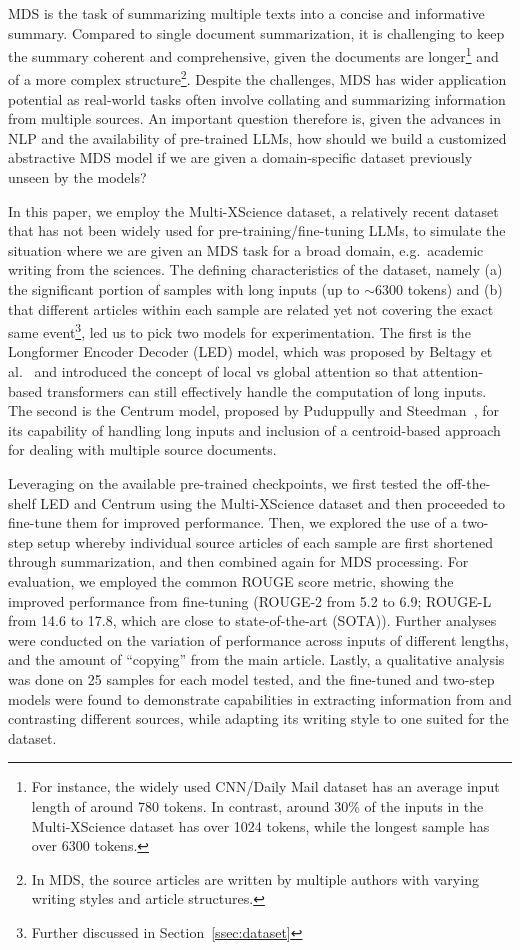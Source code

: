 \documentclass[12pt, twocolumn]{article}
\numberwithin{equation}{section}
\begin{document}
MDS is the task of summarizing multiple texts into a concise and informative summary. Compared to single document summarization, it is challenging to keep the summary coherent and comprehensive, given the documents are longer\footnote{For instance, the widely used CNN/Daily Mail dataset has an average input length of around 780 tokens.  In contrast, around 30\% of the inputs in the Multi-XScience dataset has over 1024 tokens, while the longest sample has over 6300 tokens.} and of a more complex structure\footnote{In MDS, the source articles are written by multiple authors with varying writing styles and article structures.}. Despite the challenges, MDS has wider application potential as real-world tasks often involve collating and summarizing information from multiple sources.  An important question therefore is, given the advances in NLP and the availability of pre-trained LLMs, how should we build a customized abstractive MDS model if we are given a domain-specific dataset previously unseen by the models?  

In this paper, we employ the Multi-XScience dataset, a relatively recent dataset that has not been widely used for pre-training/fine-tuning LLMs, to simulate the situation where we are given an MDS task for a broad domain, e.g.~academic writing from the sciences.  The defining characteristics of the dataset, namely (a) the significant portion of samples with long inputs (up to $\sim$6300 tokens) and (b) that different articles within each sample are related yet not covering the exact same event\footnote{Further discussed in Section~\ref{ssec:dataset}}, led us to pick two models for experimentation.  The first is the Longformer Encoder Decoder (LED) model, which was proposed by Beltagy et al.~\cite{beltagy2020longformer} and introduced the concept of local vs global attention so that attention-based transformers can still effectively handle the computation of long inputs.   The second is the Centrum model, proposed by Puduppully and Steedman~\cite{puduppully2022multidocument}, for its capability of handling long inputs and inclusion of a centroid-based approach for dealing with multiple source documents. 

Leveraging on the available pre-trained checkpoints, we first tested the off-the-shelf LED and Centrum using the Multi-XScience dataset and then proceeded to fine-tune them for improved performance.  Then, we explored the use of a two-step setup whereby individual source articles of each sample are first shortened through summarization, and then combined again for MDS processing.  For evaluation, we employed the common ROUGE score metric, showing the improved performance from fine-tuning (ROUGE-2 from 5.2 to 6.9; ROUGE-L from 14.6 to 17.8, which are close to state-of-the-art (SOTA)).  Further analyses were conducted on the variation of performance across inputs of different lengths, and the amount of ``copying'' from the main article.  Lastly, a qualitative analysis was done on 25 samples for each model tested, and the fine-tuned and two-step models were found to demonstrate capabilities in extracting information from and contrasting different sources, while adapting its writing style to one suited for the dataset.
\end{document}
